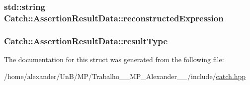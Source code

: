 \hypertarget{structCatch_1_1AssertionResultData_a9e809d36fffbeb1c7d0cbe7382dd9595}{
\subsubsection[{reconstructed\-Expression}]{\setlength{\rightskip}{0pt plus 5cm}std\-::string Catch\-::\-Assertion\-Result\-Data\-::reconstructed\-Expression\hspace{0.3cm}{\ttfamily [mutable]}}}\label{structCatch_1_1AssertionResultData_a9e809d36fffbeb1c7d0cbe7382dd9595}
\hypertarget{structCatch_1_1AssertionResultData_a7ceab4a7ff722aec5587e3748caf66b7}{
\subsubsection[{result\-Type}]{ Catch\-::\-Assertion\-Result\-Data\-::result\-Type}}\label{structCatch_1_1AssertionResultData_a7ceab4a7ff722aec5587e3748caf66b7}


The documentation for this struct was generated from the following file\-:\begin{DoxyCompactItemize}
\item 
/home/alexander/\-Un\-B/\-M\-P/\-Trabalho\-\_\-\_\-\-M\-P\-\_\-\-Alexander\-\_\-\_/include/\hyperlink{catch_8hpp}{catch.\-hpp}\end{DoxyCompactItemize}
